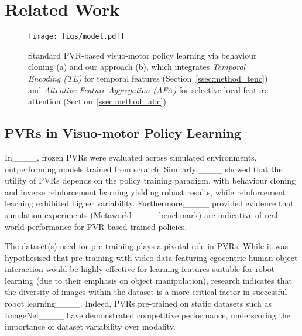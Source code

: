 \section{Related Work}
\begin{figure*}[!t]
\begin{center}
\centerline{\texttt{[image: figs/model.pdf]}}
\vspace{-10pt}
\caption{Standard PVR-based visuo-motor policy learning via behaviour cloning (a) and our approach (b), which integrates \emph{Temporal Encoding (TE)} for temporal features (Section~\ref{ssec:method_tenc}) and \emph{Attentive Feature Aggregation (AFA)} for selective local feature attention (Section~\ref{ssec:method_abc}).}
\label{fig:model}
\end{center}
\vspace{-15pt}
\end{figure*}

\subsection{PVRs in Visuo-motor Policy Learning}
In____, frozen PVRs were evaluated across simulated environments, outperforming models trained from scratch. %
Similarly,____ showed that the utility of PVRs depends on the policy training paradigm, with behaviour cloning and inverse reinforcement learning yielding robust results, while reinforcement learning exhibited higher variability. 
Furthermore,____ provided evidence that simulation experiments (\eg Metaworld____ benchmark) are indicative of real world performance for PVR-based trained policies. 

The dataset(s) used for pre-training plays a pivotal role in PVRs. 
While it was hypothesised that pre-training with video data featuring egocentric human-object interaction would be highly effective for learning features suitable for robot learning (due to their emphasis on object manipulation), research indicates that the diversity of images within the dataset is a more critical factor in successful robot learning____. 
Indeed, PVRs pre-trained on static datasets such as ImageNet____ have demonstrated competitive performance, underscoring the importance of dataset variability over modality. 

